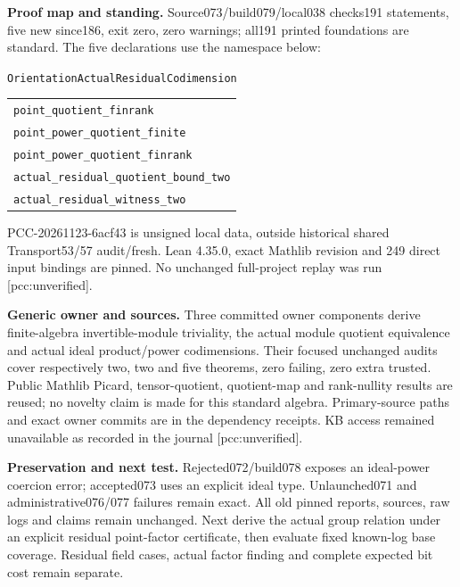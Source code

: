 \documentclass[11pt]{article}
\begin{document}
\textbf{Proof map and standing.}
Source073/build079/local038 checks191 statements, five new since186, exit zero,
zero warnings; all191 printed foundations are standard. The five declarations
use the namespace below:
\begin{center}\texttt{OrientationActualResidualCodimension}\end{center}
\begin{center}\begin{tabular}{l}
\texttt{point\_quotient\_finrank}\\
\texttt{point\_power\_quotient\_finite}\\
\texttt{point\_power\_quotient\_finrank}\\
\texttt{actual\_residual\_quotient\_bound\_two}\\
\texttt{actual\_residual\_witness\_two}
\end{tabular}\end{center}
PCC-20261123-6acf43 is unsigned local data, outside historical shared
Transport53/57 audit/fresh. Lean 4.35.0, exact Mathlib revision and 249 direct
input bindings are pinned. No unchanged full-project replay was run
[pcc:unverified].

\textbf{Generic owner and sources.}
Three committed owner components derive finite-algebra invertible-module
triviality, the actual module quotient equivalence and actual ideal product/power
codimensions. Their focused unchanged audits cover respectively two, two and
five theorems, zero failing, zero extra trusted. Public Mathlib Picard,
tensor-quotient, quotient-map and rank-nullity results are reused; no novelty
claim is made for this standard algebra. Primary-source paths and exact owner
commits are in the dependency receipts. KB access remained unavailable as
recorded in the journal [pcc:unverified].

\textbf{Preservation and next test.}
Rejected072/build078 exposes an ideal-power coercion error; accepted073 uses
an explicit ideal type. Unlaunched071 and administrative076/077 failures remain
exact. All old pinned reports, sources, raw logs and claims remain unchanged.
Next derive the actual group relation under an explicit residual point-factor
certificate, then evaluate fixed known-log base coverage. Residual field cases,
actual factor finding and complete expected bit cost remain separate.
\end{document}
